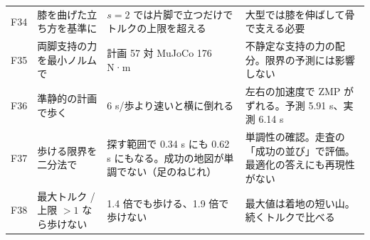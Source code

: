 \documentclass[paper=a4paper,fontsize=10pt,twocolumn,column_gap=2zw,line_length=24zw,number_of_lines=46,head_space=20mm]{jlreq}
\begin{document}
\begin{table}[t]
\begin{tabular}{cp{}p{}p{}}
F34 & 膝を曲げた立ち方を基準に & $s=2$ では片脚で立つだけでトルクの上限を超える & 大型では膝を伸ばして骨で支える必要 \\
F35 & 両脚支持の力を最小ノルムで & 計画 57 対 MuJoCo 176 N·m & 不静定な支持の力の配分。限界の予測には影響しない \\
F36 & 準静的の計画で歩く & 6 s/歩より速いと横に倒れる & 左右の加速度で ZMP がずれる。予測 5.91 s、実測 6.14 s \\
F37 & 歩ける限界を二分法で & 探す範囲で 0.34 s にも 0.62 s にもなる。成功の地図が単調でない（足のねじれ） & 単調性の確認。走査の「成功の並び」で評価。最適化の答えにも再現性がない \\
F38 & 最大トルク / 上限 $>1$ なら歩けない & 1.4 倍でも歩ける、1.9 倍で歩けない & 最大値は着地の短い山。続くトルクで比べる \\\bottomrule
\end{tabular}
\end{table}
\end{document}
